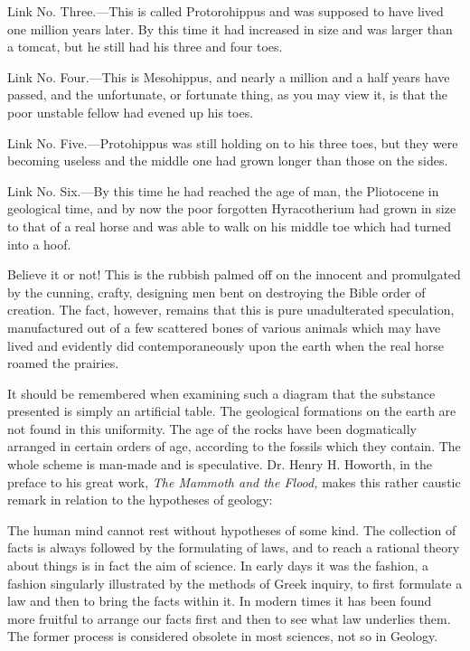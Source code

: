 Link No. Three.—This is called Protorohippus and was supposed to have lived one million
years later. By this time it had increased in size and was larger than a tomcat, but he still had
his three and four toes.

Link No. Four.—This is Mesohippus, and nearly a million and a half years have passed, and
the unfortunate, or fortunate thing, as you may view it, is that the poor unstable fellow had
evened up his toes.

Link No. Five.—Protohippus was still holding on to his three toes, but they were becoming
useless and the middle one had grown longer than those on the sides.

Link No. Six.—By this time he had reached the age of man, the Pliotocene in geological
time, and by now the poor forgotten Hyracotherium had grown in size to that of a real horse
and was able to walk on his middle toe which had turned into a hoof.

Believe it or not! This is the rubbish palmed off on the innocent and promulgated by the
cunning, crafty, designing men bent on destroying the Bible order of creation. The fact,
however, remains that this is pure unadulterated speculation, manufactured out of a few
scattered bones of various animals which may have lived and evidently did
contemporaneously upon the earth when the real horse roamed the prairies.

It should be remembered when examining such a diagram that the substance presented is
simply an artificial table. The geological formations on the earth are not found in this
uniformity. The age of the rocks have been dogmatically arranged in certain orders of age,
according to the fossils which they contain. The whole scheme is man-made and is
speculative. Dr. Henry H. Howorth, in the preface to his great work, \textit{The Mammoth and the
Flood,} makes this rather caustic remark in relation to the hypotheses of geology:

The human mind cannot rest without hypotheses of some kind. The collection of facts is
always followed by the formulating of laws, and to reach a rational theory about things is in
fact the aim of science. In early days it was the fashion, a fashion singularly illustrated by the
methods of Greek inquiry, to first formulate a law and then to bring the facts within it. In
modern times it has been found more fruitful to arrange our facts first and then to see what
law underlies them. The former process is considered obsolete in most sciences, not so in
Geology.

